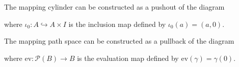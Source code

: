     \begin{remark}
        The mapping cylinder can be constructed as a pushout of the diagram
        \begin{center}
        \end{center}
        where $\iota_0: A\hookrightarrow A\times I$ is the inclusion map
        defined by $\iota_0(a) = (a,0)$.

        The mapping path space can be constructed as a pullback of 
        the diagram
        \begin{center}
        \end{center}
        where $\mathrm{ev}: \mathcal{P}(B) \to B$ 
        is the evaluation map defined by 
        $\mathrm{{ev}}(\gamma) = \gamma(0)$.
    \end{remark}

